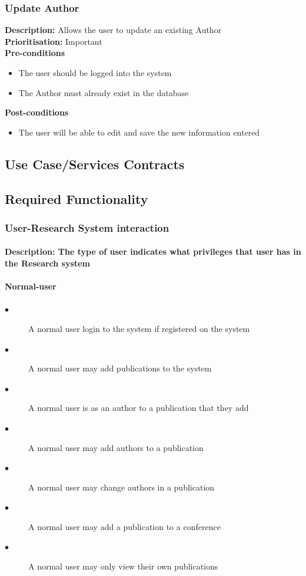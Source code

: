 \documentclass[a4paper]{article}
\begin{document}
	\subsubsection{Update Author}
	\textbf{Description:} Allows the user to update an existing Author\\
	\textbf{Prioritisation:} Important\\
	
	\textbf{Pre-conditions}
	 \begin{itemize}
		\item The user should be logged into the system
		\item The Author must already exist in the database
	\end{itemize}
	
	\textbf{Post-conditions}
	 \begin{itemize}
		\item The user will be able to edit and save the new information entered
	\end{itemize}
    
    \pagebreak
	\subsection{Use Case/Services Contracts}
	
	\subsection{Required Functionality}
	\subsubsection{User-Research System interaction}
	\paragraph{\textbf{Description:} The type of user indicates what privileges that user has in the Research system}
	\paragraph{\textbf{Normal-user}}
	\begin{description}
		\item[$\bullet$] A normal user login to the system if registered on the system
		\item[$\bullet$] A normal user may add publications to the system
		\item[$\bullet$] A normal user is as an author to a publication that they add
		\item[$\bullet$] A normal user may add authors to a publication
		\item[$\bullet$] A normal user may change authors in a publication
		\item[$\bullet$] A normal user may add a publication to a conference
		\item[$\bullet$] A normal user may only view their own publications
	\end{description}
\end{document}
